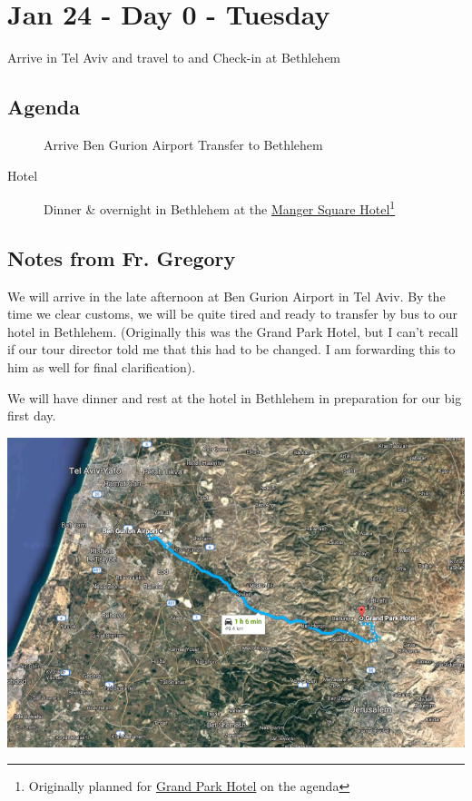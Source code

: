 \documentclass[letterpaper]{report}
\begin{document}

\chapter{Jan 24 - Day 0 - Tuesday}
Arrive in Tel Aviv and travel to and Check-in at Bethlehem

\section{Agenda}
\begin{description}
  \item[] Arrive Ben Gurion Airport Transfer to Bethlehem
  \item[Hotel] Dinner \& overnight in Bethlehem at the 
    \href{http://www.mangersquarehotel.com/}{
      Manger Square Hotel}\footnote{
        Originally planned for \href{http://www.grandpark.com/bethlehem/}{
          Grand Park Hotel} on the agenda}
\end{description}

\section{Notes from Fr. Gregory}
We will arrive in the late afternoon at Ben Gurion Airport in Tel Aviv.
By the time we clear customs, we will be quite tired and ready to transfer by bus 
to our hotel in Bethlehem.
(Originally this was the Grand Park Hotel, but I can't recall if our tour 
director told me that this had to be changed.
I am forwarding this to him as well for final clarification).


We will have dinner and rest at the hotel in Bethlehem in preparation for our
big first day.

\includegraphics[width=\textwidth]{AirportToHotel}
\end{document}
